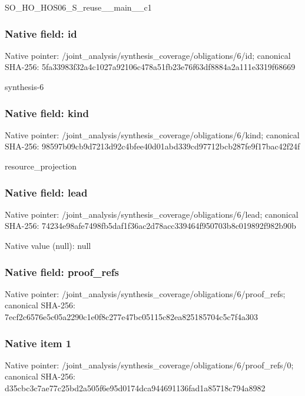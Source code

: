 \documentclass[10pt,a4paper]{article}
\begin{document}
\begingroup\raggedright\sloppy SO\_\allowbreak{}HO\_\allowbreak{}HOS06\_\allowbreak{}S\_\allowbreak{}reuse\_\allowbreak{}\_\allowbreak{}main\_\allowbreak{}\_\allowbreak{}c1\par\endgroup

\subsubsection{Native field: id}
Native pointer: /joint\_\allowbreak{}analysis/synthesis\_\allowbreak{}coverage/obligations/6/id; canonical SHA-256: 5fa33983f32a4c1027a92106c478a51fb23e76f63df8884a2a111e3319f68669

\begingroup\raggedright\sloppy synthesis-6\par\endgroup

\subsubsection{Native field: kind}
Native pointer: /joint\_\allowbreak{}analysis/synthesis\_\allowbreak{}coverage/obligations/6/kind; canonical SHA-256: 98597b09cb9d7213d92c4bfee40d01abd339cd97712bcb287fe9f17bac42f24f

\begingroup\raggedright\sloppy resource\_\allowbreak{}projection\par\endgroup

\subsubsection{Native field: lead}
Native pointer: /joint\_\allowbreak{}analysis/synthesis\_\allowbreak{}coverage/obligations/6/lead; canonical SHA-256: 74234e98afe7498fb5daf1f36ac2d78acc339464f950703b8c019892f982b90b

Native value (null): null

\subsubsection{Native field: proof\_\allowbreak{}refs}
Native pointer: /joint\_\allowbreak{}analysis/synthesis\_\allowbreak{}coverage/obligations/6/proof\_\allowbreak{}refs; canonical SHA-256: 7ecf2c6576e5c05a2290c1e0f8c277e47bc05115c82ea825185704c5c7f4a303

\subsubsection{Native item 1}
Native pointer: /joint\_\allowbreak{}analysis/synthesis\_\allowbreak{}coverage/obligations/6/proof\_\allowbreak{}refs/0; canonical SHA-256: d35cbc3c7ae77c25bd2a505f6e95d0174dca944691136fad1a85718c794a8982
\end{document}
